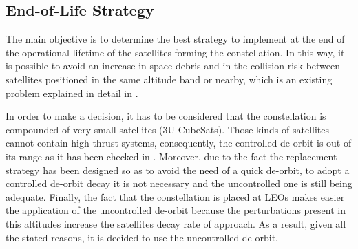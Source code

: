 \subsection{End-of-Life Strategy}
The main objective is to determine the best strategy to implement at the end of the operational lifetime of the satellites forming the constellation. In this way, it is possible to avoid an increase in space debris and in the collision risk between satellites positioned in the same altitude band or nearby, which is an existing problem explained in detail in \cite[Chapter 1, Section 2]{annex2}.

In order to make a decision, it has to be considered that the constellation is compounded of very small satellites (3U CubeSats). Those kinds of satellites cannot contain high thrust systems, consequently, the controlled de-orbit is out of its range as it has been checked in \cite[Chapter 1, Section 4]{annex2}. Moreover, due to the fact the replacement strategy has been designed so as to avoid the need of a quick de-orbit, to adopt a controlled de-orbit decay it is not necessary and the uncontrolled one is still being adequate. Finally, the fact that the constellation is placed at LEOs makes easier the application of the uncontrolled de-orbit because the perturbations present in this altitudes increase the satellites decay rate of approach. As a result, given all the stated reasons, it is decided to use the uncontrolled de-orbit. 